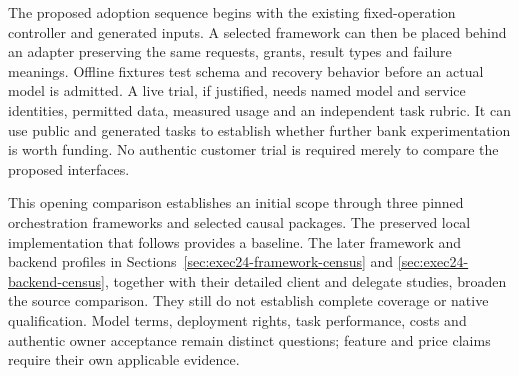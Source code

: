 The proposed adoption sequence begins with the existing fixed-operation
controller and generated inputs. A selected framework can then be placed
behind an adapter preserving the same requests, grants, result types and
failure meanings. Offline fixtures test schema and recovery behavior before
an actual model is admitted. A live trial, if justified, needs named model
and service identities, permitted data, measured usage and an independent
task rubric. It can use public and generated tasks to establish whether
further bank experimentation is worth funding. No authentic customer
trial is required merely to compare the proposed interfaces.

This opening comparison establishes an initial scope through three pinned
orchestration frameworks and selected causal packages. The preserved local
implementation that follows provides a baseline. The later framework and
backend profiles in Sections~\ref{sec:exec24-framework-census} and
\ref{sec:exec24-backend-census}, together with their detailed client and
delegate studies, broaden the source comparison. They still do not establish
complete coverage or native qualification. Model terms, deployment rights,
task performance, costs and authentic owner acceptance remain distinct
questions; feature and price claims require their own applicable evidence.
\citep{exec14_l6_design,exec14_l6_local}

\label{exec14:l6-extension-end}
